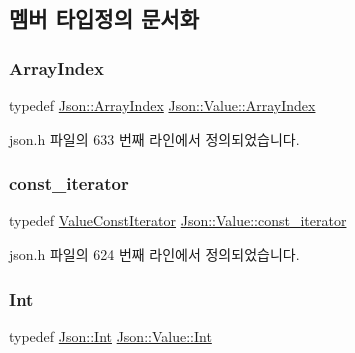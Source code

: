 \subsection{멤버 타입정의 문서화}
\mbox{\label{class_json_1_1_value_a184a91566cccca7b819240f0d5561c7d}} 
\subsubsection{\texorpdfstring{Array\+Index}{ArrayIndex}}
{\footnotesize\ttfamily typedef \hyperlink{namespace_json_a8048e741f2177c3b5d9ede4a5b8c53c2}{Json\+::\+Array\+Index} \hyperlink{class_json_1_1_value_a184a91566cccca7b819240f0d5561c7d}{Json\+::\+Value\+::\+Array\+Index}}



json.\+h 파일의 633 번째 라인에서 정의되었습니다.

\mbox{\label{class_json_1_1_value_af92282ca92b58b320debd486afb7696a}} 
\subsubsection{\texorpdfstring{const\+\_\+iterator}{const\_iterator}}
{\footnotesize\ttfamily typedef \hyperlink{class_json_1_1_value_const_iterator}{Value\+Const\+Iterator} \hyperlink{class_json_1_1_value_af92282ca92b58b320debd486afb7696a}{Json\+::\+Value\+::const\+\_\+iterator}}



json.\+h 파일의 624 번째 라인에서 정의되었습니다.

\mbox{\label{class_json_1_1_value_abdf7a7ff73eb130ffcab28504ffdb405}} 
\subsubsection{\texorpdfstring{Int}{Int}}
{\footnotesize\ttfamily typedef \hyperlink{namespace_json_a08122e8005b706d982e48cca1e2119c7}{Json\+::\+Int} \hyperlink{class_json_1_1_value_abdf7a7ff73eb130ffcab28504ffdb405}{Json\+::\+Value\+::\+Int}}



